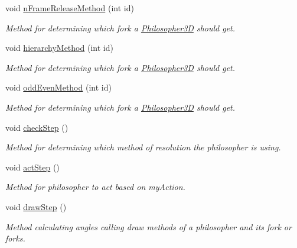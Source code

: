 \begin{DoxyCompactItemize}
void \hyperlink{class_table3_d_a3f4c3035efbd707eb34ca3eef4e71340}{n\+Frame\+Release\+Method} (int id)
\begin{DoxyCompactList}\small\item\em Method for determining which fork a \hyperlink{class_philosopher3_d}{Philosopher3D} should get. \end{DoxyCompactList}\item 
void \hyperlink{class_table3_d_a4fac6d05e99d37817b7f5e510d363e47}{hierarchy\+Method} (int id)
\begin{DoxyCompactList}\small\item\em Method for determining which fork a \hyperlink{class_philosopher3_d}{Philosopher3D} should get. \end{DoxyCompactList}\item 
void \hyperlink{class_table3_d_acc4b9ab7a1110676580d64a67d4c1168}{odd\+Even\+Method} (int id)
\begin{DoxyCompactList}\small\item\em Method for determining which fork a \hyperlink{class_philosopher3_d}{Philosopher3D} should get. \end{DoxyCompactList}\item 
\mbox{\label{class_table3_d_a224df9c2aa5031d34790bace97f017ac}} 
void \hyperlink{class_table3_d_a224df9c2aa5031d34790bace97f017ac}{check\+Step} ()
\begin{DoxyCompactList}\small\item\em Method for determining which method of resolution the philosopher is using. \end{DoxyCompactList}\item 
\mbox{\label{class_table3_d_a4c150347abc897cc4d8e6e6df8d72db6}} 
void \hyperlink{class_table3_d_a4c150347abc897cc4d8e6e6df8d72db6}{act\+Step} ()
\begin{DoxyCompactList}\small\item\em Method for philosopher to act based on my\+Action. \end{DoxyCompactList}\item 
\mbox{\label{class_table3_d_a14060acff36f9a3de159df41e072a086}} 
void \hyperlink{class_table3_d_a14060acff36f9a3de159df41e072a086}{draw\+Step} ()
\begin{DoxyCompactList}\small\item\em Method calculating angles calling draw methods of a philosopher and its fork or forks. \end{DoxyCompactList}\end{DoxyCompactItemize}


